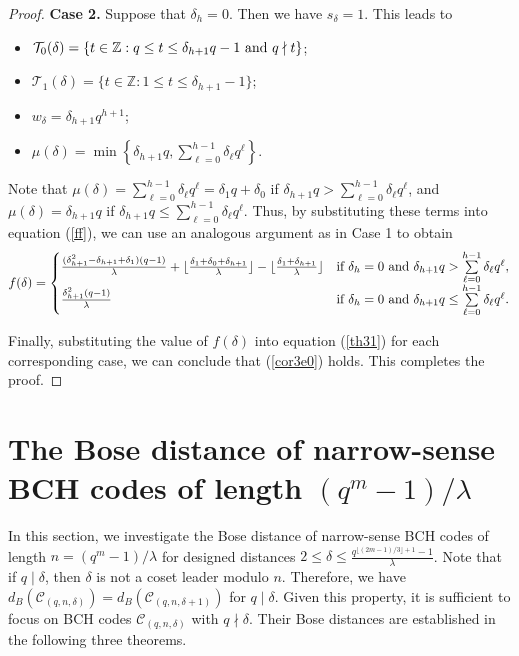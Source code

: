 \documentclass[journal,onecolumn]{IEEEtran}
\begin{document}
\begin{proof}
 \textbf{Case 2.} Suppose that  $\delta_h=0$. Then we have $s_{\delta}=1$.  This  leads to 
\begin{itemize}
     \item $\mathcal{T}_0(\delta)=\left\{t\in \mathbb{Z}: q\leq t\leq  \delta_{h+1}q-1\hbox{ and }q\nmid t\right\}$;
     
    \item  $\mathcal{T}_1(\delta)=\{t\in \mathbb{Z}:1\leq t\leq \delta_{h+1}-1\}$;
    \item $w_{\delta}=\delta_{h+1}q^{h+1}$;
    \item  $\mu(\delta)=\min\left\{ \delta_{h+1}q, \sum\limits_{\ell=0}^{h-1}\delta_{\ell}q^{\ell} \right\}.$
    
\end{itemize}
Note that  $\mu(\delta)=\sum\limits_{\ell=0}^{h-1}\delta_{\ell}q^{\ell}=\delta_1q+\delta_0$ if $\delta_{h+1}q>\sum\limits_{\ell=0}^{h-1}\delta_{\ell}q^{\ell}$, and $\mu(\delta)=\delta_{h+1}q$ if $\delta_{h+1}q\leq \sum\limits_{\ell=0}^{h-1}\delta_{\ell}q^{\ell}$. Thus,
by  substituting these  terms into equation (\ref{ff}), we can use  an analogous argument as in {Case 1}  to obtain 
\begin{equation}\notag
    f(\delta)= \begin{cases}
      \frac{(\delta_{h+1}^2-\delta_{h+1}+\delta_1)(q-1)}{\lambda}+\lfloor \frac{\delta_1+\delta_0+\delta_{h+1}}{\lambda}\rfloor -\lfloor \frac{\delta_1+\delta_{h+1}}{\lambda}\rfloor& \hbox{if
      } \delta_h=0\hbox{ and }\delta_{h+1}q>\sum\limits_{\ell=0}^{h-1}\delta_{\ell}q^{\ell},\\
      \frac{\delta_{h+1}^2(q-1)}{\lambda} &\hbox{if
      }\delta_h=0\hbox{ and }\delta_{h+1}q\leq \sum\limits_{\ell=0}^{h-1}\delta_{\ell}q^{\ell}.
    \end{cases}
\end{equation} 

Finally, substituting the value of $f(\delta)$ into equation (\ref{th31}) for each corresponding case, we can conclude that  (\ref{cor3e0}) holds. This completes the proof.
\end{proof}


\section{The Bose distance  of narrow-sense BCH codes of length \texorpdfstring{$ (q^m-1)/\lambda $}\  }\label{bose}
In this section, we investigate the Bose distance of narrow-sense BCH codes of length $n=(q^m-1)/\lambda$ for designed distances  $2\leq \delta \leq \frac{q^{\lfloor (2m-1)/3\rfloor+1}-1}{\lambda}$.
Note that if $q \mid \delta$, then $\delta$ is not a coset leader modulo $n$. Therefore, we have $d_B(\mathcal{C}_{(q,n,\delta)})=d_B(\mathcal{C}_{(q,n,\delta+1)})$ for $q \mid \delta$.
Given this property, it is sufficient to focus on BCH codes $\mathcal{C}_{(q,n,\delta)}$ with $q \nmid \delta$. Their Bose distances are established in the following three theorems.
\end{document}
